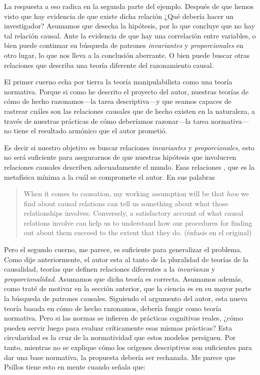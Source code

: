 La respuesta a eso radica en la segunda parte del ejemplo.
Después de que hemos visto que hay evidencia de que existe
dicha relación ¿Qué debería hacer un investigador? Asumamos
que desecha la hipótesis, por lo que concluye que no hay tal
relación causal. Ante la evidencia de que hay una
correlación entre variables, o bien puede continuar su 
búsqueda de patrones \emph{invariantes} y
\emph{proporcionales} en otro lugar, lo que nos lleva a la
conclusión aberrante. O bien puede buscar otras relaciones
que describa una teoría diferente del razonamiento causal.      

El primer cuerno echa por tierra la teoría manipulabilista
como una teoría normativa. Porque si como he descrito el
proyecto del autor, nuestras teorías de cómo de hecho
razonamos---la tarea descriptiva---y que seamos capaces de
rastrear cuáles son las relaciones causales que de hecho
existen en la naturaleza, a través de nuestras prácticas de
cómo deberíamos razonar---la tarea normativa---no tiene el
resultado armónico que el autor prometió.   

Es decir si nuestro objetivo es buscar relaciones
\emph{invariantes} y \emph{proporcionales,} esto no será
suficiente para asegurarnos de que nuestras hipótesis que
involucren relaciones causales describen adecuadamente el
mundo. Esas relaciones , que es la metafísica
mínima a la cuál se compromete el autor. En sus palabras

  \begin{quote}
    When it comes to causation, my working assumption will
    be that \emph{how} we find about causal relations can
    tell us something about what those relationships
    involves. Conversely, a satisfactory account of what
    causal relations involve can help us to understand how
    our procedures for finding out about them succeed to the
    extent that they do. (énfasis en el original)
    \parencite[p.~10]{caushuman} 
  \end{quote}


Pero el segundo cuerno, me parece, es suficiente para
generalizar el problema. Como dije anteriormente, el autor
esta al tanto de la pluralidad de teorías de la causalidad,
teorías que definen relaciones diferentes a la
\emph{invarianza} y \emph{proporcionalidad}. Asumamos que
dicha teoría es correcta. Asumamos además, como traté de
motivar en la sección anterior, que la ciencia es en su
mayor parte la búsqueda de patrones causales. Siguiendo el
argumento del autor, esta nueva teoría basada en cómo de hecho
razonamos, debería fungir como teoría normativa. Pero si las
normas se infieren de prácticas cognitivas reales, ¿cómo
pueden servir luego para evaluar críticamente esas mismas
prácticas? Esta circularidad es la cruz de la normatividad
que estos modelos persiguen. Por tanto, mientras no se
explique cómo los orígenes descriptivos son suficientes para
dar una base normativa, la propuesta debería ser
rechazada. Me parece que Psillos tiene esto en mente cuando
señala que:

